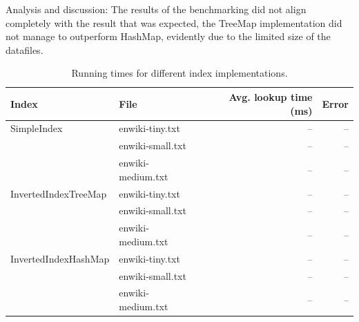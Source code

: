 Analysis and discussion:
The results of the benchmarking did not align completely with the result that was expected, the TreeMap implementation did not manage to outperform HashMap, evidently due to the limited size of the datafiles. 

\begin{table}[t]
\begin{tabular}{@{}llr@{}r} \toprule
	Index & File & Avg. lookup time (ms) &Error \\ \midrule
	SimpleIndex  & enwiki-tiny.txt	& -- & -- \\ 
				 & enwiki-small.txt	& -- & -- \\
				 & enwiki-medium.txt& -- & -- \\
	InvertedIndexTreeMap	& enwiki-tiny.txt	& -- & --\\
							& enwiki-small.txt	& -- & --\\
							& enwiki-medium.txt & -- & --\\
	InvertedIndexHashMap	& enwiki-tiny.txt	& -- & --\\
							& enwiki-small.txt	& -- & --\\
							& enwiki-medium.txt & -- & --\\ \bottomrule
\end{tabular}
	\caption{Running times for different index implementations.}
\label{tab:benchmark:indices}
\end{table}


